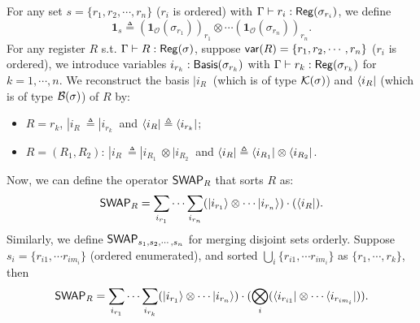For any set $s = \{r_1,r_2,\cdots,r_n\}$ ($r_i$ is ordered) with $\Gamma \vdash r_i : \mathsf{Reg}(\sigma_{r_i})$, we define 
$$\mathbf{1}_s \triangleq (\mathbf{1}_{\mathcal{O}}(\sigma_{r_1}))_{r_1}\otimes\cdots(\mathbf{1}_{\mathcal{O}}(\sigma_{r_n}))_{r_n}.$$
For any register $R$ s.t. $\Gamma\vdash R : \mathsf{Reg}(\sigma)$, suppose $\mathsf{var}(R) = \{r_1,r_2,\cdots,r_n\}$ ($r_i$ is ordered), 
we introduce variables $i_{r_k} : \mathsf{Basis}(\sigma_{r_k})$ with $\Gamma \vdash r_k : \mathsf{Reg}(\sigma_{r_k})$ for $k = 1,\cdots, n$. 
We reconstruct the basis $|i_R\>$ (which is of type $\mathcal{K}(\sigma)$) and $\langle i_R|$ (which is of type $\mathcal{B}(\sigma)$) of $R$ by:
\begin{itemize}
  \item $R = r_k$, $|i_R\> \triangleq |i_{r_k}\>$ and $\langle i_R| \triangleq \langle i_{r_k}|$;
  \item $R = (R_1,R_2)$: $|i_R\> \triangleq |i_{R_1}\> \otimes |i_{R_2}\>$ and $\langle i_R| \triangleq \langle i_{R_1}| \otimes \langle i_{R_2}|$.
\end{itemize}
Now, we can define the operator ${\mathsf{SWAP}}_R$ that sorts $R$ as: 
$${\mathsf{SWAP}}_R = \sum_{i_{r_1}}\cdots\sum_{i_{r_n}} (|i_{r_1}\rangle\otimes\cdots|i_{r_n}\rangle)\cdot(\langle i_R|).$$
Similarly, we define ${\mathsf{SWAP}}_{s_1,s_2,\cdots,s_n}$ for merging disjoint sets orderly. Suppose $s_i = \{r_{i1},\cdots r_{im_i}\}$ (ordered enumerated), and sorted $\bigcup_i\{r_{i1},\cdots r_{im_i}\}$ as $\{r_1,\cdots,r_k\}$, then  
$${\mathsf{SWAP}}_R = \sum_{i_{r_1}}\cdots\sum_{i_{r_k}} (|i_{r_1}\rangle\otimes\cdots|i_{r_n}\rangle)\cdot(\bigotimes_i(\langle i_{r_{i1}}|\otimes\cdots \langle i_{r_{im_i}}|)).$$

